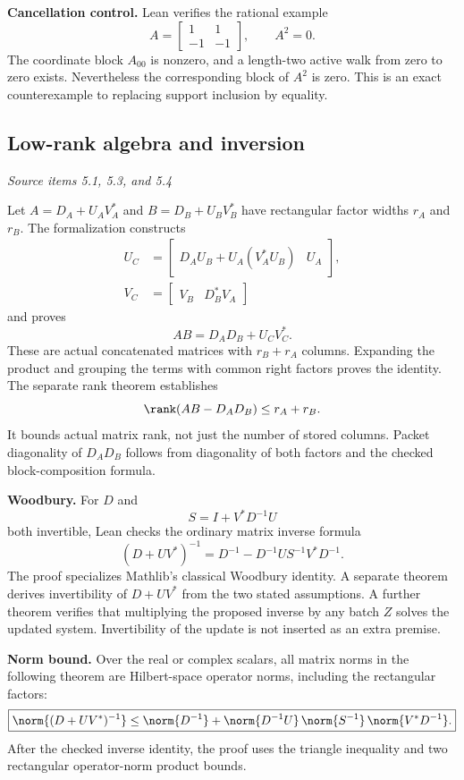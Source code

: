 \textbf{Cancellation control.} Lean verifies the rational example
\[
A=\begin{bmatrix}1&1\\-1&-1\end{bmatrix},\qquad A^2=0.
\]
The coordinate block $A_{00}$ is nonzero, and a length-two active walk from zero to zero exists. Nevertheless the corresponding block of $A^2$ is zero. This is an exact counterexample to replacing support inclusion by equality.



\subsection{Low-rank algebra and inversion}\label{supp1:subsection:003}\textit{Source items 5.1, 5.3, and 5.4}\par
Let $A=D_A+U_AV_A^*$ and $B=D_B+U_BV_B^*$ have rectangular factor widths $r_A$ and $r_B$. The formalization constructs
\begin{align*}
U_C&=\begin{bmatrix}D_AU_B+U_A(V_A^*U_B)&U_A\end{bmatrix},\\
V_C&=\begin{bmatrix}V_B&D_B^*V_A\end{bmatrix}
\end{align*}
and proves
\[
\boxed{AB=D_AD_B+U_CV_C^*.}
\]
These are actual concatenated matrices with $r_B+r_A$ columns. Expanding the product and grouping the terms with common right factors proves the identity. The separate rank theorem establishes
\[
\rank(AB-D_AD_B)\le r_A+r_B.
\]
It bounds actual matrix rank, not just the number of stored columns. Packet diagonality of $D_AD_B$ follows from diagonality of both factors and the checked block-composition formula.

\textbf{Woodbury.} For $D$ and
\[
S=I+V^*D^{-1}U
\]
both invertible, Lean checks the ordinary matrix inverse formula
\[
\boxed{(D+UV^*)^{-1}
=D^{-1}-D^{-1}US^{-1}V^*D^{-1}.}
\]
The proof specializes Mathlib's classical Woodbury identity. A separate theorem derives invertibility of $D+UV^*$ from the two stated assumptions. A further theorem verifies that multiplying the proposed inverse by any batch $Z$ solves the updated system. Invertibility of the update is not inserted as an extra premise.

\textbf{Norm bound.} Over the real or complex scalars, all matrix norms in the following theorem are Hilbert-space operator norms, including the rectangular factors:
\[
\boxed{
\norm{(D+UV^*)^{-1}}
\le\norm{D^{-1}}+
\norm{D^{-1}U}\,\norm{S^{-1}}\,\norm{V^*D^{-1}}.
}
\]
After the checked inverse identity, the proof uses the triangle inequality and two rectangular operator-norm product bounds.


